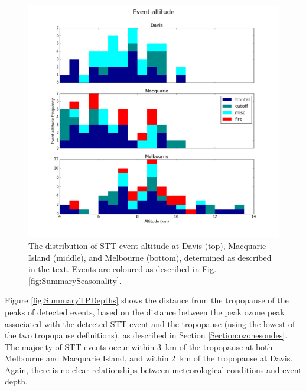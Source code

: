 \documentclass{article}
\begin{document}
  \begin{figure}[!htbp]
    \begin{center}
    \includegraphics[width=0.99\columnwidth]{figures/summary_altitude.png}
    \caption{The distribution of STT event altitude at Davis (top), Macquarie Island (middle), and Melbourne (bottom), determined as described in the text.
    Events are coloured as described in Fig. \ref{fig:SummarySeasonality}.}
    \label{fig:SummaryAltitudes}
    \end{center}
  \end{figure}

  Figure \ref{fig:SummaryTPDepths} shows the distance from the tropopause of the peaks of detected events, based on the distance between the peak ozone peak associated with the detected STT event and the tropopause (using the lowest of the two tropopause definitions), as described in Section \ref{Section:ozonesondes}.
  The majority of STT events occur within 3~km of the tropopause at both Melbourne and Macquarie Island, and within 2~km of the tropopause at Davis. 
  Again, there is no clear relationships between meteorological conditions and event depth.
\end{document}
